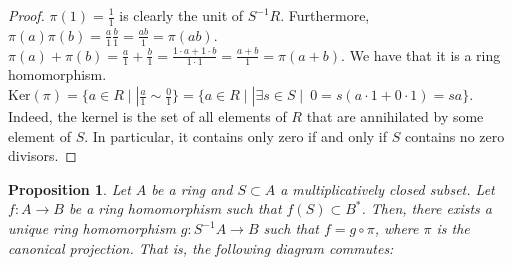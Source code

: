\documentclass[11pt]{article}
\newtheorem{prop}[theorem]{Proposition}
\theoremstyle{definition}
\begin{document}
            \begin{proof}
                $\pi(1) = \frac{1}{1}$ is clearly the unit of $S^{-1}R$.
                Furthermore, $\pi(a) \pi(b) = \frac{a}{1} \frac{b}{1} = \frac{ab}{1} = \pi(ab)$.
                $\pi(a) + \pi(b) = \frac{a}{1} + \frac{b}{1} = \frac{1 \cdot a + 1 \cdot b}{1 \cdot 1} = \frac{a+b}{1} = \pi(a + b)$.
                We have that it is a ring homomorphism. $\text{Ker}(\pi) = \{a \in R \mid | \frac{a}{1} \sim \frac{0}{1}\} =
                \{a \in R \mid | \exists s \in S \mid \ 0 = s (a \cdot 1 + 0 \cdot 1) = sa\}$.
                Indeed, the kernel is the set of all elements of $R$ that are annihilated by some element of $S$.
                In particular, it contains only zero if and only if $S$ contains no zero divisors.
            \end{proof}

        \begin{prop}
            Let $A$ be a ring and $S \subset A$ a multiplicatively closed subset.
            Let $f: A \rightarrow B$ be a ring homomorphism such that $f(S) \subset B^*$.
            Then, there exists a unique ring homomorphism
            $g: S^{-1}A \rightarrow B$ such that $f = g \circ \pi$, where $\pi$
            is the canonical projection.
            That is, the following diagram commutes:

            \begin{center}
            \end{center}

        \end{prop}
\end{document}
